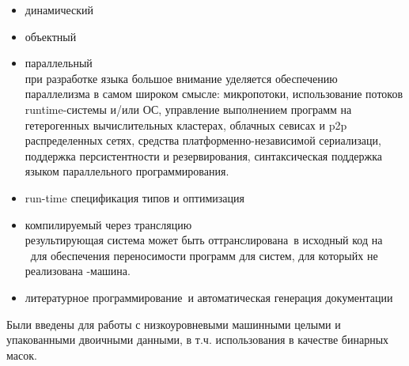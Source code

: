 \secdown


\begin{itemize}

\item динамический

\item объектный

\item параллельный
\\ при разработке языка большое внимание уделяется обеспечению параллелизма в 
самом широком смысле: микропотоки, использование потоков runtime-системы и/или
ОС, управление выполнением программ на гетерогенных вычислительных кластерах, 
облачных севисах и p2p распределенных сетях, средства платформенно-независимой
сериализаци, поддержка персистентности и резервирования, синтаксическая 
поддержка языком параллельного программирования. 

\item run-time спецификация типов и оптимизация

\item компилируемый через трансляцию
\\ результирующая система может быть оттранслирована\ в 
исходный код на \cpp\ для обеспечения переносимости программ для систем, для
которыйх не реализована \bi-машина.

\item литературное программирование\ и 
автоматическая генерация документации  

\end{itemize}


\secdown

\secdown
{}

Были введены для работы с низкоуровневыми машинными целыми и упакованными
двоичными данными, в т.ч. использования в качестве бинарных масок. 

\secup

\secdown
{}

\secup

